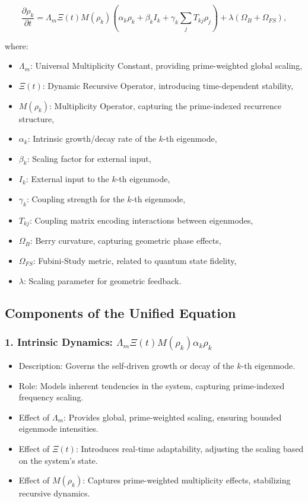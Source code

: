 \documentclass[12pt]{article}
\theoremstyle{plain}
\begin{document}
\begin{equation}
\frac{\partial \rho_k}{\partial t} = \Lambda_m \Xi(t) M(\rho_k) \left( \alpha_k \rho_k + \beta_k I_k + \gamma_k \sum_j T_{kj} \rho_j \right) + \lambda (\Omega_B + \Omega_{FS}),
\end{equation}

where:

\begin{itemize}
    \item \( \Lambda_m \): Universal Multiplicity Constant, providing prime-weighted global scaling,
    \item \( \Xi(t) \): Dynamic Recursive Operator, introducing time-dependent stability,
    \item \( M(\rho_k) \): Multiplicity Operator, capturing the prime-indexed recurrence structure,
    \item \( \alpha_k \): Intrinsic growth/decay rate of the \( k \)-th eigenmode,
    \item \( \beta_k \): Scaling factor for external input,
    \item \( I_k \): External input to the \( k \)-th eigenmode,
    \item \( \gamma_k \): Coupling strength for the \( k \)-th eigenmode,
    \item \( T_{kj} \): Coupling matrix encoding interactions between eigenmodes,
    \item \( \Omega_B \): Berry curvature, capturing geometric phase effects,
    \item \( \Omega_{FS} \): Fubini-Study metric, related to quantum state fidelity,
    \item \( \lambda \): Scaling parameter for geometric feedback.
\end{itemize}

\subsection{Components of the Unified Equation}

\subsubsection{1. Intrinsic Dynamics: \( \Lambda_m \Xi(t) M(\rho_k) \alpha_k \rho_k \)}
\begin{itemize}
    \item Description: Governs the self-driven growth or decay of the \( k \)-th eigenmode.
    \item Role: Models inherent tendencies in the system, capturing prime-indexed frequency scaling.
    \item Effect of \(\Lambda_m\): Provides global, prime-weighted scaling, ensuring bounded eigenmode intensities.
    \item Effect of \(\Xi(t)\): Introduces real-time adaptability, adjusting the scaling based on the system's state.
    \item Effect of \(M(\rho_k)\): Captures prime-weighted multiplicity effects, stabilizing recursive dynamics.
\end{itemize}
\end{document}
